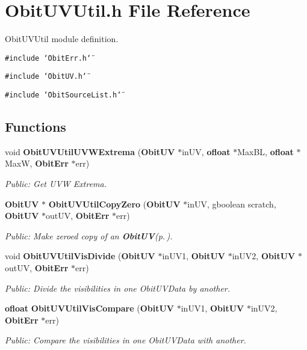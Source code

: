\section{Obit\-UVUtil.h File Reference}
\label{ObitUVUtil_8h}
Obit\-UVUtil module definition. 

{\tt \#include \char`\"{}Obit\-Err.h\char`\"{}}\par
{\tt \#include \char`\"{}Obit\-UV.h\char`\"{}}\par
{\tt \#include \char`\"{}Obit\-Source\-List.h\char`\"{}}\par
\subsection*{Functions}
\begin{CompactItemize}
\item 
void {\bf Obit\-UVUtil\-UVWExtrema} ({\bf Obit\-UV} $\ast$in\-UV, {\bf ofloat} $\ast$Max\-BL, {\bf ofloat} $\ast$Max\-W, {\bf Obit\-Err} $\ast$err)
\begin{CompactList}\small\item\em Public: Get UVW Extrema. \item\end{CompactList}\item 
{\bf Obit\-UV} $\ast$ {\bf Obit\-UVUtil\-Copy\-Zero} ({\bf Obit\-UV} $\ast$in\-UV, gboolean scratch, {\bf Obit\-UV} $\ast$out\-UV, {\bf Obit\-Err} $\ast$err)
\begin{CompactList}\small\item\em Public: Make zeroed copy of an {\bf Obit\-UV}{\rm (p.\,\pageref{structObitUV})}. \item\end{CompactList}\item 
void {\bf Obit\-UVUtil\-Vis\-Divide} ({\bf Obit\-UV} $\ast$in\-UV1, {\bf Obit\-UV} $\ast$in\-UV2, {\bf Obit\-UV} $\ast$out\-UV, {\bf Obit\-Err} $\ast$err)
\begin{CompactList}\small\item\em Public: Divide the visibilities in one Obit\-UVData by another. \item\end{CompactList}\item 
{\bf ofloat} {\bf Obit\-UVUtil\-Vis\-Compare} ({\bf Obit\-UV} $\ast$in\-UV1, {\bf Obit\-UV} $\ast$in\-UV2, {\bf Obit\-Err} $\ast$err)
\begin{CompactList}\small\item\em Public: Compare the visibilities in one Obit\-UVData with another. \item\end{CompactList}\item 

\end{CompactItemize}
